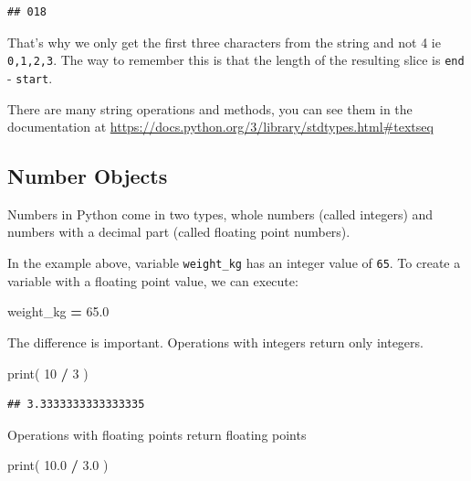 \documentclass[]{book}
\newenvironment{Shaded}{\begin{snugshade}}{\end{snugshade}}
\newcommand{\BuiltInTok}[1]{#1}
\newcommand{\DecValTok}[1]{\textcolor[rgb]{0.00,0.00,0.81}{#1}}
\newcommand{\FloatTok}[1]{\textcolor[rgb]{0.00,0.00,0.81}{#1}}
\newcommand{\NormalTok}[1]{#1}
\newcommand{\OperatorTok}[1]{\textcolor[rgb]{0.81,0.36,0.00}{\textbf{#1}}}
\theoremstyle{definition}
\theoremstyle{definition}
\theoremstyle{definition}
\theoremstyle{remark}
\begin{document}
\begin{verbatim}
## 018
\end{verbatim}

That's why we only get the first three characters from the string and
not 4 ie \texttt{0,1,2,3}. The way to remember this is that the length
of the resulting slice is \texttt{end} - \texttt{start}.

There are many string operations and methods, you can see them in the
documentation at
\href{}{https://docs.python.org/3/library/stdtypes.html\#textseq}

\hypertarget{number-objects}{%
\subsection{Number Objects}\label{number-objects}}

Numbers in Python come in two types, whole numbers (called integers) and
numbers with a decimal part (called floating point numbers).

In the example above, variable \texttt{weight\_kg} has an integer value
of \texttt{65}. To create a variable with a floating point value, we can
execute:

\begin{Shaded}
\begin{Highlighting}[]
\NormalTok{weight_kg }\OperatorTok{=} \FloatTok{65.0}
\end{Highlighting}
\end{Shaded}

The difference is important. Operations with integers return only
integers.

\begin{Shaded}
\begin{Highlighting}[]
\BuiltInTok{print}\NormalTok{( }\DecValTok{10} \OperatorTok{/} \DecValTok{3}\NormalTok{ )}
\end{Highlighting}
\end{Shaded}

\begin{verbatim}
## 3.3333333333333335
\end{verbatim}

Operations with floating points return floating points

\begin{Shaded}
\begin{Highlighting}[]
\BuiltInTok{print}\NormalTok{( }\FloatTok{10.0} \OperatorTok{/} \FloatTok{3.0}\NormalTok{ )}
\end{Highlighting}
\end{Shaded}
\end{document}
